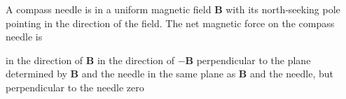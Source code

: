 \begin{questions}\setcounter{question}{27}\question
A compass needle is in a uniform magnetic field $\mathbf{B}$ with its north-seeking pole pointing in the direction of the field. The net magnetic force on the compass needle is

\begin{choices}
\choice in the direction of $\mathbf{B}$
\choice in the direction of $-\mathbf{B}$
\choice perpendicular to the plane determined by $\mathbf{B}$ and the needle
\choice in the same plane as $\mathbf{B}$ and the needle, but perpendicular to the needle
\choice zero
\end{choices}\end{questions}

